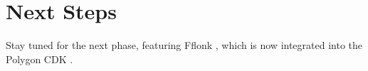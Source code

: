 \section{Next Steps}

Stay tuned for the next phase, featuring Fflonk \cite{website:Fflonk}, which is now integrated into the Polygon CDK \cite{website:Polygon-CDK}.


    
